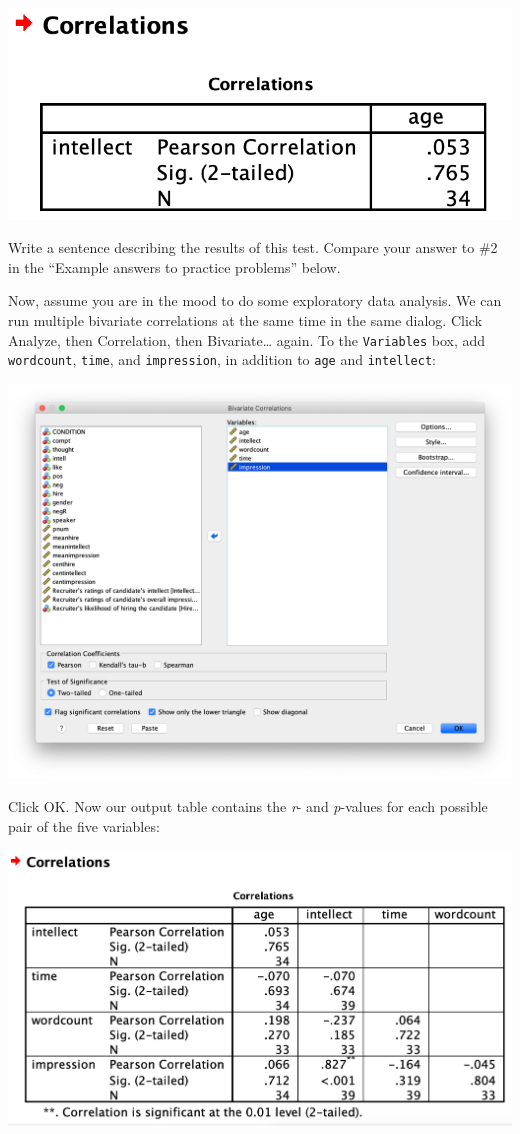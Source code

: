 \documentclass[
]{book}
\begin{document}
\includegraphics{img/7.4.28.png}

Write a sentence describing the results of this test. Compare your answer to \#2 in the ``Example answers to practice problems'' below.

Now, assume you are in the mood to do some exploratory data analysis. We can run multiple bivariate correlations at the same time in the same dialog. Click {Analyze}, then {Correlation}, then {Bivariate\ldots{}} again. To the \texttt{Variables} box, add \texttt{wordcount}, \texttt{time}, and \texttt{impression}, in addition to \texttt{age} and \texttt{intellect}:

\includegraphics{img/7.4.29.png}

Click {OK}. Now our output table contains the \emph{r}- and \emph{p}-values for each possible pair of the five variables:

\includegraphics{img/7.4.30.png}
\end{document}
